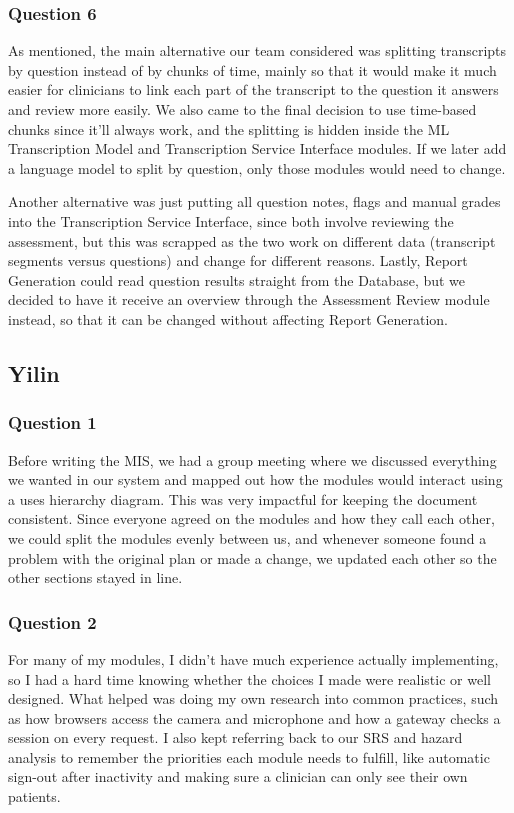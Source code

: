 \documentclass[12pt, titlepage]{article}
\begin{document}
\begin{enumerate}
\subsubsection*{Question 6}
As mentioned, the main alternative our team considered was splitting transcripts by question 
instead of by chunks of time, mainly so that it would make it much easier for clinicians to 
link each part of the transcript to the question it answers and review more easily.
We also came to the final decision to use time-based chunks since it'll always work, 
and the splitting is hidden inside the ML Transcription Model and Transcription Service Interface modules. 
If we later add a language model to split by question, only those modules would need to change.

Another alternative was just putting all question notes, flags and manual grades into the 
Transcription Service Interface, since both involve reviewing the assessment, but this was scrapped
as the two work on different data (transcript segments versus questions) and change for different reasons. 
Lastly, Report Generation could read question results straight from the Database, but we decided
to have it receive an overview through the Assessment Review module instead, so that it 
can be changed without affecting Report Generation.

\subsection*{Yilin}
\subsubsection*{Question 1}
Before writing the MIS, we had a group meeting where we discussed everything we
wanted in our system and mapped out how the modules would interact using a uses
hierarchy diagram. This was very impactful for keeping the document consistent.
Since everyone agreed on the modules and how they call each other, we could
split the modules evenly between us, and whenever someone found a problem with
the original plan or made a change, we updated each other so the other sections
stayed in line.

\subsubsection*{Question 2}
For many of my modules, I didn't
have much experience actually implementing, so I had a
hard time knowing whether the choices I made were realistic or well designed.
What helped was doing my own research into common practices, such as how
browsers access the camera and microphone and how a gateway checks a session on
every request. I also kept referring back to our SRS and hazard analysis to
remember the priorities each module needs to fulfill, like automatic sign-out
after inactivity and making sure a clinician can only see their own patients.


\end{enumerate}
\end{document}
